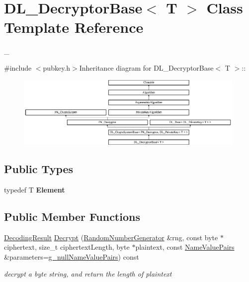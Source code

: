\hypertarget{class_d_l___decryptor_base}{
\section{DL\_\-DecryptorBase$<$ T $>$ Class Template Reference}
\label{class_d_l___decryptor_base}
}


\_\-  


{\ttfamily \#include $<$pubkey.h$>$}Inheritance diagram for DL\_\-DecryptorBase$<$ T $>$::\begin{figure}[H]
\begin{center}
\leavevmode
\includegraphics[height=3.45679cm]{class_d_l___decryptor_base}
\end{center}
\end{figure}
\subsection*{Public Types}
\begin{DoxyCompactItemize}
\item 
\hypertarget{class_d_l___decryptor_base_a8ff27bdbc35dc6c0cb3c42b8512749e0}{
typedef T {\bfseries Element}}
\label{class_d_l___decryptor_base_a8ff27bdbc35dc6c0cb3c42b8512749e0}

\end{DoxyCompactItemize}
\subsection*{Public Member Functions}
\begin{DoxyCompactItemize}
\item 
\hyperlink{struct_decoding_result}{DecodingResult} \hyperlink{class_d_l___decryptor_base_a5a23bde8893b76023182413d24f75b74}{Decrypt} (\hyperlink{class_random_number_generator}{RandomNumberGenerator} \&rng, const byte $\ast$ciphertext, size\_\-t ciphertextLength, byte $\ast$plaintext, const \hyperlink{class_name_value_pairs}{NameValuePairs} \&parameters=\hyperlink{cryptlib_8h_ab1b0f7d11a21c6163be8ca2662ce2ac6}{g\_\-nullNameValuePairs}) const 
\begin{DoxyCompactList}\small\item\em decrypt a byte string, and return the length of plaintext \item\end{DoxyCompactList}\end{DoxyCompactItemize}


